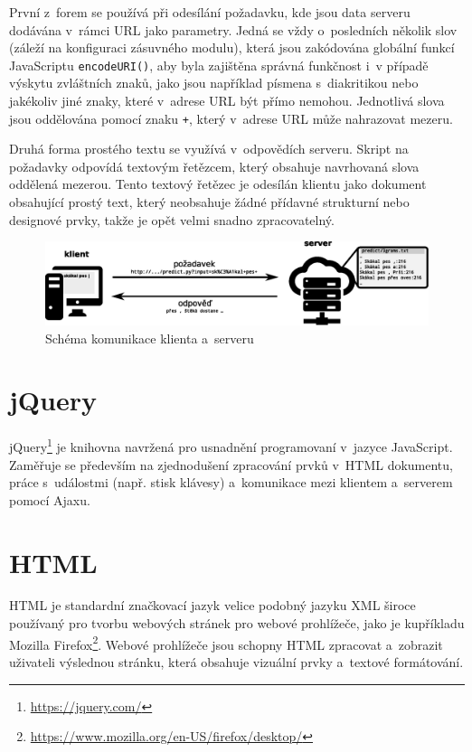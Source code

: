 \documentclass[a4paper,11pt,openany]{book} %
\begin{document}
První z~forem se používá při odesílání požadavku, kde jsou data serveru dodávána v~rámci URL jako parametry. Jedná se vždy o~posledních několik slov (záleží na konfiguraci zásuvného modulu), která jsou zakódována globální funkcí JavaScriptu {\tt encodeURI()}, aby byla zajištěna správná funkčnost i~v případě výskytu zvláštních znaků, jako jsou například písmena s~diakritikou nebo jakékoliv jiné znaky, které v~adrese URL být přímo nemohou. Jednotlivá slova jsou oddělována pomocí znaku {\tt +}, který v~adrese URL může nahrazovat mezeru.

Druhá forma prostého textu se využívá v~odpovědích serveru. Skript na požadavky odpovídá textovým řetězcem, který obsahuje navrhovaná slova oddělená mezerou. Tento textový řetězec je odesílán klientu jako dokument obsahující prostý text, který neobsahuje žádné přídavné strukturní nebo designové prvky, takže je opět velmi snadno zpracovatelný.

\begin{figure}[h]
	\centering
	\includegraphics[width=1.0\textwidth]{client-server-schema1.eps}
	\caption{Schéma komunikace klienta a~serveru\protect\footnotemark}
	\label{fig:clientserver}
\end{figure}


\section{jQuery}

jQuery\footnote{\url{https://jquery.com/}} je knihovna navržená pro usnadnění programovaní v~jazyce JavaScript. Zaměřuje se především na zjednodušení zpracování prvků v~HTML dokumentu, práce s~událostmi (např. stisk klávesy) a~komunikace mezi klientem a~serverem pomocí Ajaxu.

\section{HTML}

HTML je standardní značkovací jazyk velice podobný jazyku XML široce používaný pro tvorbu webových stránek pro webové prohlížeče, jako je kupříkladu Mozilla Firefox\footnote{\url{https://www.mozilla.org/en-US/firefox/desktop/}}. Webové prohlížeče jsou schopny HTML zpracovat a~zobrazit uživateli výslednou stránku, která obsahuje vizuální prvky a~textové formátování. \parencite[19--22]{raggett1999html}
\end{document}
